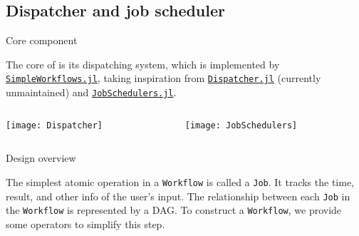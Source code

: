 \subsection{Dispatcher and job scheduler}

\begin{frame}{Core component}

    The core of \express{} is its dispatching system,
    which is implemented by
    \href{https://github.com/MineralsCloud/SimpleWorkflows.jl}{\texttt{SimpleWorkflows.jl}},
    taking inspiration from
    \href{https://github.com/invenia/Dispatcher.jl}{\texttt{Dispatcher.jl}}
    (currently unmaintained) and
    \href{https://github.com/cihga39871/JobSchedulers.jl}{\texttt{JobSchedulers.jl}}.

    \begin{columns}[t]
        \begin{column}{0.4\textwidth}
            \begin{center}
                \texttt{[image: Dispatcher]}
            \end{center}
        \end{column}
        \hfill
        \begin{column}{0.4\textwidth}
            \begin{center}
                \texttt{[image: JobSchedulers]}
            \end{center}
        \end{column}
    \end{columns}

\end{frame}

\begin{frame}{Design overview}

    The simplest atomic operation in a \texttt{Workflow} is called a \texttt{Job}.
    It tracks the time, result, and other info of the user's input.
    The relationship between each \texttt{Job} in the \texttt{Workflow} is represented by a
    DAG.
    To construct a \texttt{Workflow}, we provide some operators to simplify this step.

\end{frame}

